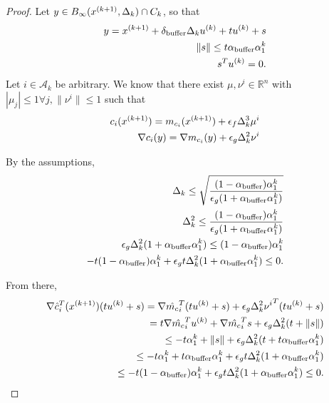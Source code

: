 \begin{proof}


Let $y \in B_{\infty}({x}^{(k+1)}, \Delta_k)\cap C_k$, so that
\begin{align*}
y = {x}^{(k+1)} + {\delta_{\text{buffer}}}\Delta_k u^{(k)} + tu^{(k)} + s \\
\|s\| \le t {\alpha_{\text{buffer}}}\alpha_1^k \\
s^Tu^{(k)} = 0.
\end{align*}
Let $i \in \mathcal A_k$ be arbitrary.
We know that there exist $\mu,\nu^i\in\mathbb R^n$ with $|\mu_j| \le 1\forall j, \|\nu^i\|\le 1$ such that
\begin{align*}
c_i({x}^{(k+1)}) = m_{c_i}({x}^{(k+1)}) + \epsilon_f \Delta_k^3 \mu^i \\
\nabla c_i(y) = \nabla m_{c_i}(y) + \epsilon_g \Delta_k^2 \nu^i
\end{align*}


By the assumptions,
\begin{align*}
\Delta_k \le \sqrt{\frac{(1 - {\alpha_{\text{buffer}}}) \alpha_1^k}{\epsilon_g(1 + {\alpha_{\text{buffer}}}\alpha_1^k)}}\\
\Delta_k^2  \le \frac{(1 - {\alpha_{\text{buffer}}}) \alpha_1^k}{\epsilon_g(1 + {\alpha_{\text{buffer}}}\alpha_1^k)}\\
\epsilon_g \Delta_k^2 (1 + {\alpha_{\text{buffer}}}\alpha_1^k) \le (1 - {\alpha_{\text{buffer}}}) \alpha_1^k\\
-t(1 - {\alpha_{\text{buffer}}}) \alpha_1^k + \epsilon_g t\Delta_k^2 (1 + {\alpha_{\text{buffer}}}\alpha_1^k) \le 0.
\end{align*}

From there,
\begin{align*}
\nabla \hat c_{i}^T({x}^{(k+1)})(tu^{(k)} + s) = 
\nabla \hat {m_c}_{i}^T(tu^{(k)} + s) + \epsilon_g \Delta_k^2 {\nu^i}^T(tu^{(k)} + s) \\
=t\nabla \hat {m_c}_{i}^Tu^{(k)} + \nabla \hat {m_c}_{i}^Ts + \epsilon_g \Delta_k^2 (t + \|s\|) \\
\le -t \alpha_1^k + \|s\| + \epsilon_g \Delta_k^2 (t + t {\alpha_{\text{buffer}}}\alpha_1^k) \\
\le -t \alpha_1^k + t {\alpha_{\text{buffer}}} \alpha_1^k  + \epsilon_g t\Delta_k^2 (1 + {\alpha_{\text{buffer}}}\alpha_1^k) \\
\le -t(1 - {\alpha_{\text{buffer}}}) \alpha_1^k  + \epsilon_g t\Delta_k^2 (1 + {\alpha_{\text{buffer}}}\alpha_1^k) \le 0.
\end{align*}




\end{proof}
